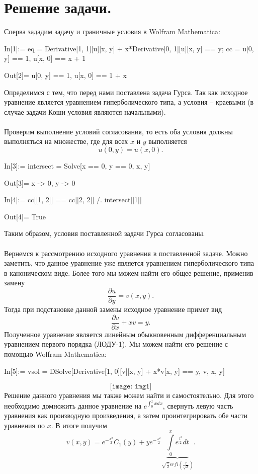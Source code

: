 \documentclass[a4paper, 12pt]{report}
\begin{document}
	\section*{Решение задачи.}
	Сперва зададим задачу и граничные условия в Wolfram Mathematica:
	\begin{listingcont}
In[1]:= eq = Derivative[1, 1][u][x, y] + x*Derivative[0, 1][u][x, y] == y;
	cc = {u[0, y] == 1, u[x, 0] == x + 1}

Out[2]= {u[0, y] == 1, u[x, 0] == 1 + x}\end{listingcont}
Определимся с тем, что перед нами поставлена задача Гурса. Так как исходное уравнение является уравнением гиперболического типа, а условия -- краевыми (в случае задачи Коши условия являются начальными).\\\\
Проверим выполнение условий согласования, то есть оба условия должны выполняться на множестве, где для всех $x$ и $y$ выполняется $$u(0, y) = u (x, 0).$$
	\begin{listingcont}
In[3]:= intersect = Solve[{x == 0, y == 0}, {x, y}]

Out[3]= {{x -> 0, y -> 0}}

In[4]:= cc[[1, 2]] == cc[[2, 2]] /. intersect[[1]]

Out[4]= True\end{listingcont}
Таким образом, условия поставленной задачи Гурса согласованы. \\\\
Вернемся к рассмотрению исходного уравнения в поставленной задаче. Можно заметить, что данное уравнение уже является уравнением гиперболического типа в каноническом виде. Более того мы можем найти его общее решение, применив замену $$\dfrac{\partial u}{\partial y} = v(x,y).$$
Тогда при подстановке данной замены исходное уравнение примет вид $$\dfrac{\partial v}{\partial x} + xv = y.$$
Полученное уравнение является линейным обыкновенным дифференциальным уравнением первого порядка (ЛОДУ-1). Мы можем найти его решение с помощью Wolfram Mathematica:
\begin{listingcont}
In[5]:= vsol = DSolve[Derivative[1, 0][v][x, y] + x*v[x, y] == y, v, {x, y}]
\end{listingcont}
$$
	\texttt{[image: img1]}
$$
Решение данного уравнения мы также можем найти и самостоятельно. Для этого необходимо домножить данное уравнение на $e^{\int_0^x x dx}$, свернуть левую часть уравнения как производную произведения, а затем проинтегрировать обе части уравнения по $x$. В итоге получим $$v(x,y) = e^{-\frac{x^2}{2}}C_1(y) + ye^{-\frac{x^2}{2}} \underbrace{\int\limits_0^x e^{\frac{t^2}{2}}dt}_{\sqrt{\frac\pi2} erfi\left(\frac {x}{\sqrt2}\right)}.$$
\end{document}
